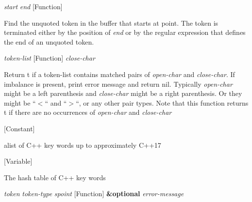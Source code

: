 \vspace{1em}
\noindent
{}
\usebox{\funcname}\emph{start} \emph{end}
 \hfill [Function]

\begin{doc-string}
Find the unquoted token in the buffer that starts at point.  The token is
terminated either by the position of \emph{end} or by the regular expression that
defines the end of an unquoted token.
\end{doc-string}

\vspace{1em}
\noindent
{}
\usebox{\funcname}\emph{token-list}
 \hfill [Function]
\hspace*{\wd\funcname}\emph{close-char}

\begin{doc-string}
Return t if a token-list contains matched pairs of \emph{open-char} and \emph{close-char}.
If imbalance is present, print error message and return nil.  Typically \emph{open-char}
might be a left parenthesis and \emph{close-char} might be a right parenthesis.  Or they
might be ``$<$`` and ``$>$``, or any other pair types.  Note that this function
returns t if there are no occurrences of \emph{open-char} and \emph{close-char}
\end{doc-string}

\vspace{1em}
\noindent
{}
\usebox{\funcname}
 \hfill [Constant]

\begin{doc-string}
alist of C++ key words up to approximately C++17
\end{doc-string}

\vspace{1em}
\noindent
{}
\usebox{\funcname}
 \hfill [Variable]

\begin{doc-string}
The hash table of C++ key words
\end{doc-string}

\vspace{1em}
\noindent
{}
\usebox{\funcname}\emph{token} \emph{token-type} \emph{spoint}
 \hfill [Function]
\hspace*{\wd\funcname}\textbf{\&optional} \emph{error-message}

